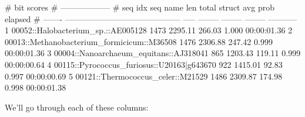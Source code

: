 \begin{sreoutputtiny}
#                                                                 bit scores                           
#                                                             ------------------                       
# seq idx  seq name                                      len     total    struct  avg prob      elapsed
# -------  ------------------------------------------  -----  --------  --------  --------  -----------
        1  00052::Halobacterium_sp.::AE005128           1473   2295.11    266.03     1.000  00:00:01.36
        2  00013::Methanobacterium_formicicum::M36508   1476   2306.88    247.42     0.999  00:00:01.36
        3  00004::Nanoarchaeum_equitans::AJ318041        865   1203.43    119.11     0.999  00:00:00.64
        4  00115::Pyrococcus_furiosus::U20163|g643670    922   1415.01     92.83     0.997  00:00:00.69
        5  00121::Thermococcus_celer::M21529            1486   2309.87    174.98     0.998  00:00:01.38
\end{sreoutputtiny}

We'll go through each of these columns:

